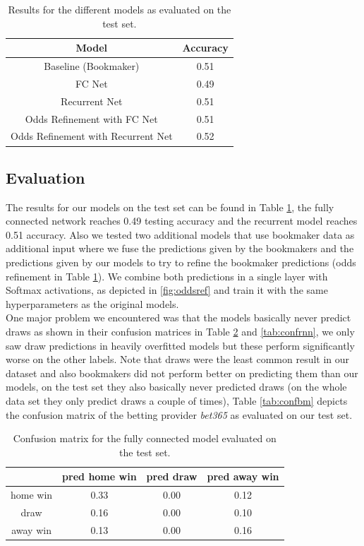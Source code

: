 \documentclass[a4paper]{article}
\begin{document}
\begin{table}
\begin{tabular}{|c|c|}
\hline 
\textbf{Model} & \textbf{Accuracy} \\ 
\hline 
\hline 
Baseline (Bookmaker) & 0.51 \\ 
\hline 
FC Net & 0.49 \\ 
\hline 
Recurrent Net & 0.51 \\ 
\hline 
Odds Refinement with FC Net & 0.51 \\ 
\hline 
Odds Refinement with Recurrent Net & 0.52 \\ 
\hline 
\end{tabular} 
\label{tab:accs}
\caption{Results for the different models as evaluated on the test set.}
\end{table}


\subsection{Evaluation}
The results for our models on the test set can be found in Table \ref{tab:accs}, the fully connected network reaches 0.49 testing accuracy and the recurrent model reaches 0.51 accuracy. Also we tested two additional models that use bookmaker data as additional input where we fuse the predictions given by the bookmakers and the predictions given by our models to try to refine the bookmaker predictions (odds refinement in Table \ref{tab:accs}). We combine both predictions in a single layer with Softmax activations, as depicted in \ref{fig:oddsref} and train it with the same hyperparameters as the original models. \\
One major problem we encountered was that the models basically never predict draws as shown in their confusion matrices in Table \ref{tab:conffc} and \ref{tab:confrnn}, we only saw draw predictions in heavily overfitted models but these perform significantly worse on the other labels. Note that draws were the least common result in our dataset and also bookmakers did not perform better on predicting them than our models, on the test set they also basically never predicted draws (on the whole data set they only predict draws a couple of times), Table \ref{tab:confbm} depicts the confusion matrix of the betting provider \textit{bet365} as evaluated on our test set.

\begin{table}
\begin{tabular}{|c||c|c|c|}
\hline 
 & pred home win & pred draw  & pred away win \\ 
\hline 
\hline
home win & 0.33 & 0.00 & 0.12 \\ 
\hline 
draw & 0.16 & 0.00 & 0.10 \\ 
\hline 
away win & 0.13 & 0.00 & 0.16 \\ 
\hline 
\end{tabular} 
\caption{Confusion matrix for the fully connected model evaluated on the test set.}
\label{tab:conffc}
\end{table}
\end{document}
